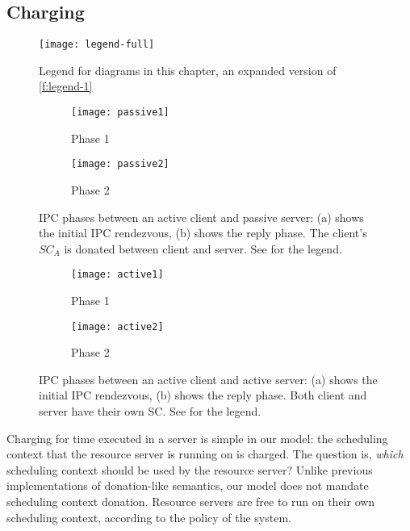 \subsection{Charging}

\begin{figure}
    \centering
    \texttt{[image: legend-full]}
    \caption[Legend for diagrams in this chapter.]{Legend for diagrams in this chapter, an expanded version of \cref{f:legend-1}}
    \label{f:legend-2}
\end{figure}


\begin{figure}
    \centering
    \begin{subfigure}[h]{0.48\textwidth}
        \centering
        \texttt{[image: passive1]}
        \caption{Phase 1}
        \label{f:passive1}
    \end{subfigure}%
    \begin{subfigure}[h]{0.48\textwidth}
        \centering
        \texttt{[image: passive2]}
        \caption{Phase 2}
        \label{f:passive2}
    \end{subfigure}
    \caption[IPC phases between an active client and passive server.]{IPC phases between an active client and passive server: (a) shows the initial \gls{IPC} rendezvous, (b) shows the
    reply phase. The client's $SC_{A}$ is donated between client and server. See  for the legend.}
    \label{f:passive}
\end{figure}
\begin{figure}
\centering
\begin{subfigure}[h]{0.48\textwidth}
    \centering
    \texttt{[image: active1]}
    \caption{Phase 1}
    \label{f:active1}
\end{subfigure}%
\begin{subfigure}[h]{0.48\textwidth}
    \centering
    \texttt{[image: active2]}
    \caption{Phase 2}
    \label{f:active2}
\end{subfigure}
\caption[IPC phases between active client and active server.]{IPC phases between an active client and active server: (a) shows the initial \gls{IPC} rendezvous, (b) shows the
reply phase. Both client and server have their own SC. See  for the legend.}
\label{f:active}
\end{figure}

Charging for time executed in a server is simple in our model: the scheduling context that
the resource server is running on is charged.
The question is, \emph{which} scheduling context should be used by the resource server? Unlike
previous implementations of donation-like semantics, our model does not mandate
scheduling context donation. Resource servers are free to run on their own scheduling context, 
according to the policy of the system.


